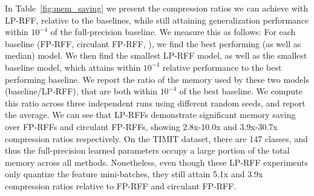 In Table~\ref{fig:mem_saving} we present the compression ratios we can achieve with LP-RFF, relative to the baselines, while still attaining generalization performance within $10^{-4}$ of the full-precision baseline.  We measure this as follows:  For each baseline (FP-RFF, circulant FP-RFF, \Nystrom), we find the best performing (as well as median) model. We then find the smallest LP-RFF model, as well as the smallest baseline model, which attains within $10^{-4}$ relative performance to the best performing baseline.  We report the ratio of the memory used by these two models (baseline/LP-RFF), that are both within $10^{-4}$ of the best baseline. We compute this ratio across three independent runs using different random seeds, and report the average.  We can see that LP-RFFs demonstrate significant memory saving over FP-RFFs and circulant FP-RFFs, showing 2.8x-10.0x and 3.9x-30.7x compression ratios respectively. On the TIMIT dataset, there are 147 classes, and thus the full-precision learned parameters occupy a large portion of the total memory across all methods. Nonetheless, even though these LP-RFF experiments only quantize the feature mini-batches, they still attain 5.1x and 3.9x compression ratios relative to FP-RFF and circulant FP-RFF.

